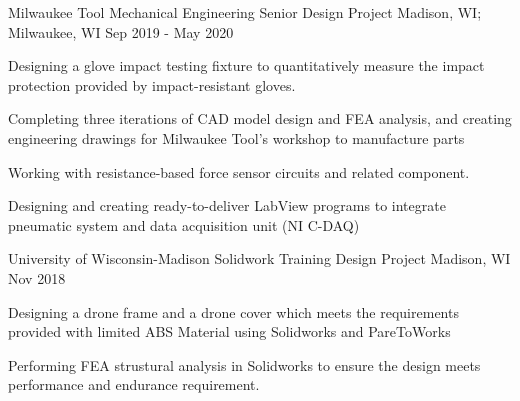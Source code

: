 

\begin{cventries}

  \cventry
    {Milwaukee Tool} %
    {Mechanical Engineering Senior Design Project} %
    {Madison, WI; Milwaukee, WI} %
    {Sep 2019 - May 2020} %
    {
      \begin{cvitems} %
        \item {Designing a glove impact testing fixture to quantitatively measure the impact protection provided by impact-resistant gloves.}
        \item {Completing three iterations of CAD model design and FEA analysis, and creating engineering drawings for Milwaukee Tool's workshop to manufacture parts}
        \item {Working with resistance-based force sensor circuits and related component.}
        \item {Designing and creating ready-to-deliver LabView programs to integrate pneumatic system and data acquisition unit (NI C-DAQ)}
      \end{cvitems}
    }


  \cventry
	{University of Wisconsin-Madison} %
	{Solidwork Training Design Project} %
	{Madison, WI} %
	{Nov 2018} %
	{
		\begin{cvitems} %
			\item {Designing a drone frame and a drone cover which meets the requirements provided with limited ABS Material using Solidworks and PareToWorks}
			\item {Performing FEA strustural analysis in Solidworks to ensure the design meets performance and endurance requirement. }
		\end{cvitems}
	}




\end{cventries}
